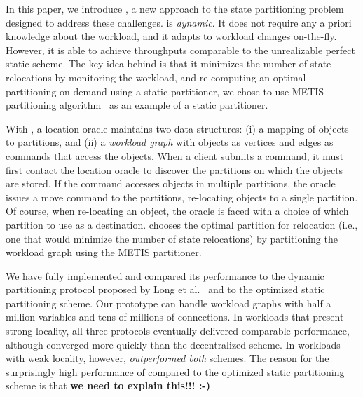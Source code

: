 In this paper, we introduce \dynastar, a new approach to the state
partitioning problem designed to address these challenges.  \dynastar
is \emph{dynamic}. It does not require any a priori knowledge about
the workload, and it adapts to workload changes on-the-fly. However,
it is able to achieve throughputs comparable to the unrealizable
perfect static scheme. The key idea behind \dynastar is that it
minimizes the number of state relocations by monitoring the workload,
and re-computing an optimal partitioning on demand using a static
partitioner, we chose to use METIS partitioning algorithm~\cite{Abou-Rjeili:2006}
as an example of a static partitioner.

With \dynastar, a location oracle maintains two data structures: (i) a
mapping of objects to partitions, and (ii) a \emph{workload graph}
with objects as vertices and edges as commands that access the
objects.  When a client submits a command, it must first contact the
location oracle to discover the partitions on which the objects are
stored.  If the command accesses objects in multiple partitions, the
oracle issues a move command to the partitions, re-locating objects to
a single partition. Of course, when re-locating an object, the oracle
is faced with a choice of which partition to use as a destination.
\dynastar chooses the optimal partition for relocation (i.e., one that
would minimize the number of state relocations) by partitioning the
workload graph using the METIS partitioner.




We have fully implemented \dynastar and compared its performance to
the dynamic partitioning protocol proposed by Long et
al.~\cite{hoang2016} and to the optimized static partitioning scheme.
Our prototype can handle workload graphs with half a million variables
and tens of millions of connections.  In workloads that present strong
locality, all three protocols eventually delivered comparable
performance, although \dynastar converged more quickly than the
decentralized scheme.  In workloads with weak locality, however,
\dynastar \emph{outperformed both} schemes.  The reason for the
surprisingly high performance of \dynastar compared to the optimized
static partitioning scheme is that \textbf{we need to explain this!!!
:-)}  

